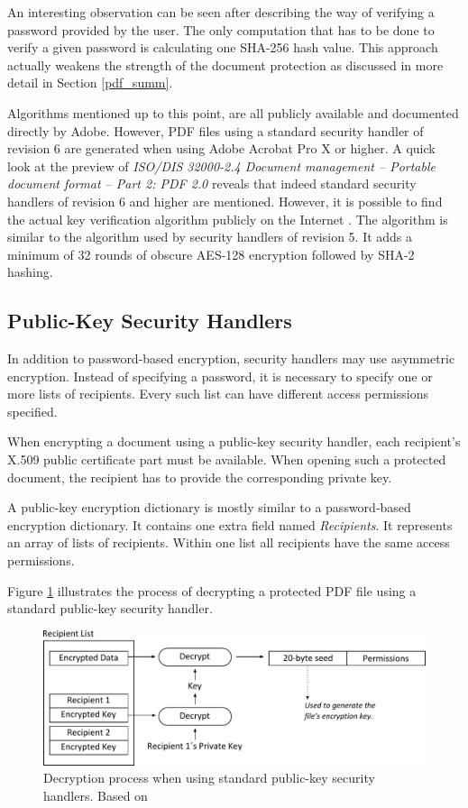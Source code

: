 \documentclass[11pt,oneside]{fithesis2}
\begin{document}
An interesting observation can be seen after describing the way of verifying a password provided by the user. The only computation that has to be done to verify a given password is calculating one SHA-256 hash value. This approach actually weakens the strength of the document protection as discussed in more detail in Section \ref{pdf_summ}.

Algorithms mentioned up to this point, are all publicly available and documented directly by Adobe. However, PDF files using a standard security handler of revision 6 are generated when using Adobe Acrobat Pro X or higher. A quick look at the preview of \textit{ISO/DIS 32000-2.4 Document management -- Portable document format -- Part 2: PDF 2.0} reveals that indeed standard security handlers of revision 6 and higher are mentioned. However, it is possible to find the actual key verification algorithm publicly on the Internet \cite{esec_lab}. The algorithm is similar to the algorithm used by security handlers of revision 5. It adds a minimum of 32 rounds of obscure AES-128 encryption followed by SHA-2 hashing.

\subsection{Public-Key Security Handlers}

In addition to password-based encryption, security handlers may use asymmetric encryption. Instead of specifying a password, it is necessary to specify one or more  lists of recipients. Every such list can have different access permissions specified. 

When encrypting a document using a public-key security handler, each recipient's X.509 public certificate part must be available. When opening such a protected document, the recipient has to provide the corresponding private key.

A public-key encryption dictionary is mostly similar to a password-based encryption dictionary. It contains one extra field named \textit{Recipients}. It represents an array of lists of recipients. Within one list all recipients have the same access permissions. 

Figure \ref{public_key_alg} illustrates the process of decrypting a protected PDF file using a standard public-key security handler.

\begin{figure}[ht]
	\centering
	\includegraphics[width=1\textwidth]{figures/public_key_alg.pdf}
	\caption{Decryption process when using standard public-key security handlers. Based on \cite[p. 130]{pdf_spec}}
	\label{public_key_alg}
\end{figure}
\end{document}
